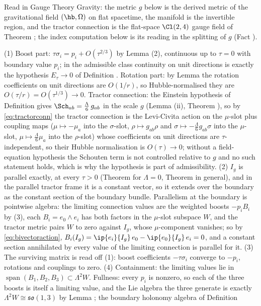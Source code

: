 Read in Gauge Theory Gravity: the metric $g$ below is the derived metric of the gravitational field $(\hb, \Omega)$ on flat spacetime, the manifold is the invertible region, and the tractor connection is the flat-space $\Cl(2,4)$ gauge field of Theorem ; the index computation below is its reading in the splitting of $g$ (Fact ).

(1) Boost part: $\tau\sigma_i = p_i + O(\tau^{2/3})$ by Lemma (2), continuous up to $\tau = 0$ with boundary value $p_i$; in the admissible class continuity on unit directions is exactly the hypothesis $E_\tau \to 0$ of Definition . Rotation part: by Lemma  the rotation coefficients on unit directions are $O(1/r)$, so Hubble-normalised they are $O(\tau/r) = O(\tau^{1/3}) \to 0$. Tractor connection: the Einstein hypothesis of Definition  gives $\Sch_{ab} = \tfrac{\Lambda}{6}\,g_{ab}$ in the scale $g$ (Lemma (ii), Theorem ), so by \eqref{eq:tractorconn} the tractor connection is the Levi-Civita action on the $\mu$-slot plus coupling maps ($\mu \mapsto -\mu_a$ into the $\sigma$-slot, $\rho \mapsto g_{ab}\rho$ and $\sigma \mapsto -\tfrac{\Lambda}{6}g_{ab}\sigma$ into the $\mu$-slot, $\mu \mapsto \tfrac{\Lambda}{6}\mu_a$ into the $\rho$-slot) whose coefficients on unit directions are $\tau$-independent, so their Hubble normalisation is $O(\tau) \to 0$; without a field-equation hypothesis the Schouten term is not controlled relative to $g$ and no such statement holds, which is why the hypothesis is part of admissibility. (2) $I_g$ is parallel exactly, at every $\tau > 0$ (Theorem  for $\Lambda = 0$, Theorem  in general), and in the parallel tractor frame it is a constant vector, so it extends over the boundary as the constant section of the boundary bundle. Parallelism at the boundary is pointwise algebra: the limiting connection values are the weighted boosts $-p_i B_i$ by (3), each $B_i = e_0 \wedge e_i$ has both factors in the $\mu$-slot subspace $W$, and the tractor metric pairs $W$ to zero against $I_g$, whose $\mu$-component vanishes; so by \eqref{eq:bivectoraction}, $B_i(I_g) = \ip{e_i}{I_g}\,e_0 - \ip{e_0}{I_g}\,e_i = 0$, and a constant section annihilated by every value of the limiting connection is parallel for it. (3) The surviving matrix is read off (1): boost coefficients $-\tau\sigma_i$ converge to $-p_i$, rotations and couplings to zero. (4) Containment: the limiting values lie in $\operatorname{span}(B_1, B_2, B_3) \subset \Lambda^2 W$. Fullness: every $p_i$ is nonzero, so each of the three boosts is itself a limiting value, and the Lie algebra the three generate is exactly $\Lambda^2 W \cong \mathfrak{so}(1,3)$ by Lemma ; the boundary holonomy algebra of Definition 